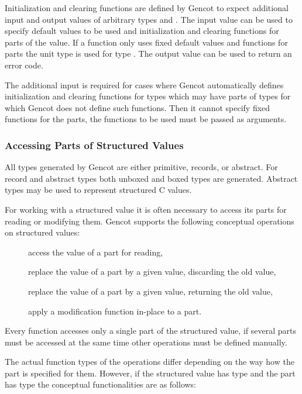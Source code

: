 Initialization and clearing functions are defined by Gencot to expect additional input and output values of 
arbitrary types  and . The input value can be used to specify default values to be used and initialization and clearing 
functions for parts of the value. If a function only uses fixed default values and functions for parts 
the unit type \code{()} is used for type . The output value can be used to return an error code.

The additional input is required for cases where Gencot automatically defines initialization and clearing
functions for types which may have parts of types for which Gencot does not define such functions. Then 
it cannot specify fixed functions for the parts, the functions to be used must be passed as arguments.

\subsubsection{Accessing Parts of Structured Values}

All types generated by Gencot are either primitive, records, or abstract. For record and abstract types both 
unboxed and boxed types are generated. Abstract types may be used to represent structured C values.

For working with a structured value it is often necessary to access its parts for reading or modifying them.
Gencot supports the following conceptual operations on structured values:
\begin{description}
  \item[] access the value of a part for reading,
  \item[] replace the value of a part by a given value, discarding the old value,
  \item[] replace the value of a part by a given value, returning the old value,
  \item[] apply a modification function in-place to a part.
\end{description}

Every function accesses only a single part of the structured value, if several parts must be accessed at the same
time other operations must be defined manually.

The actual function types of the operations differ depending on the way how the part is specified for them.
However, if the structured value has type  and the part has type  the conceptual functionalities 
are as follows:

